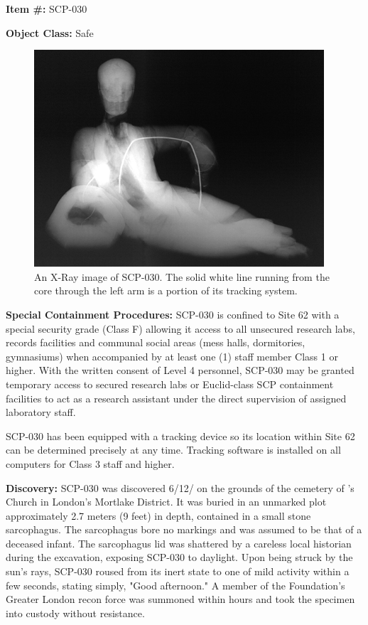 
\textbf{Item \#:} SCP-030

\textbf{Object Class:} Safe

\begin{figure}[h]
\begin{center}
\includegraphics[scale=0.55]{scp/030.jpg}
\linebreak An X-Ray image of SCP-030. The solid white line running from the core through the left arm is a portion of its tracking system.
\end{center}
\end{figure}

\textbf{Special Containment Procedures:} SCP-030 is confined to Site 62 with a special security grade (Class F) allowing it access to all unsecured research labs, records facilities and communal social areas (mess halls, dormitories, gymnasiums) when accompanied by at least one (1) staff member Class 1 or higher. With the written consent of Level 4 personnel, SCP-030 may be granted temporary access to secured research labs or Euclid-class SCP containment facilities to act as a research assistant under the direct supervision of assigned laboratory staff.

SCP-030 has been equipped with a tracking device so its location within Site 62 can be determined precisely at any time. Tracking software is installed on all computers for Class 3 staff and higher.

\textbf{Discovery:} SCP-030 was discovered 6/12/ on the grounds of the cemetery of   's Church in London's Mortlake District. It was buried in an unmarked plot approximately 2.7 meters (9 feet) in depth, contained in a small stone sarcophagus. The sarcophagus bore no markings and was assumed to be that of a deceased infant. The sarcophagus lid was shattered by a careless local historian during the excavation, exposing SCP-030 to daylight. Upon being struck by the sun's rays, SCP-030 roused from its inert state to one of mild activity within a few seconds, stating simply, "Good afternoon." A member of the Foundation's Greater London recon force was summoned within hours and took the specimen into custody without resistance.

